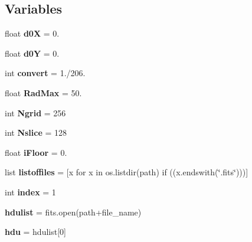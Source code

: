 \subsection*{Variables}
\begin{DoxyCompactItemize}
\item 
\mbox{\label{namespacecharm_a74d486e7ec4620488934984082bba12a}} 
float {\bfseries d0X} = 0.
\item 
\mbox{\label{namespacecharm_afb4790352700b5eed1f0468a5bf875bf}} 
float {\bfseries d0Y} = 0.
\item 
\mbox{\label{namespacecharm_a86b62e26592963beccfe23b7fc27c6cf}} 
int {\bfseries convert} = 1./206.
\item 
\mbox{\label{namespacecharm_a056a46ed88ece0b47c3cb2b8e11ce21f}} 
float {\bfseries Rad\+Max} = 50.
\item 
\mbox{\label{namespacecharm_a3a58951c597432610049813907cc4305}} 
int {\bfseries Ngrid} = 256
\item 
\mbox{\label{namespacecharm_a080a78d6a6b376fd8978d8d665113740}} 
int {\bfseries Nslice} = 128
\item 
\mbox{\label{namespacecharm_a4313cb34b067d36f49ce9bdd81bb6eb5}} 
float {\bfseries i\+Floor} = 0.
\item 
\mbox{\label{namespacecharm_a83005a8fee8e5caaf1126e17e5a30c7a}} 
list {\bfseries listoffiles} = \mbox{[}x for x in os.\+listdir(path) if ((x.\+endswith(\char`\"{}.fits\char`\"{})))\mbox{]}
\item 
\mbox{\label{namespacecharm_a750b5d744c39a06bfb13e6eb010e35d0}} 
int {\bfseries index} = 1
\item 
\mbox{\label{namespacecharm_a39bf99cca1e152f715cc20dffd261ead}} 
{\bfseries hdulist} = fits.\+open(path+file\+\_\+name)
\item 
\mbox{\label{namespacecharm_acab07a969db3493dffcc4db737d4fb74}} 
{\bfseries hdu} = hdulist\mbox{[}0\mbox{]}

\end{DoxyCompactItemize}
